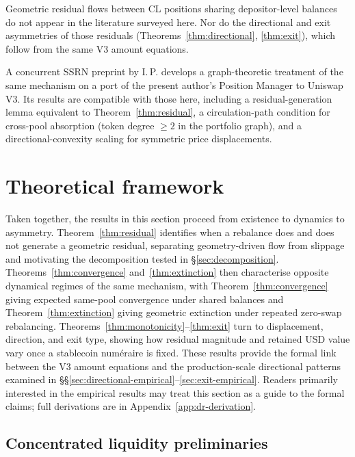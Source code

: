 \documentclass{manuscript}
\begin{document}
Geometric residual flows between CL positions sharing depositor-level balances do not appear in the literature surveyed here. Nor do the directional and exit asymmetries of those residuals (Theorems~\ref{thm:directional}, \ref{thm:exit}), which follow from the same V3 amount equations.

A concurrent SSRN preprint by I.\,P.\cite{secondoperator2026} develops a graph-theoretic treatment of the same mechanism on a port of the present author's Position Manager to Uniswap V3. Its results are compatible with those here, including a residual-generation lemma equivalent to Theorem~\ref{thm:residual}, a circulation-path condition for cross-pool absorption (token degree $\geq 2$ in the portfolio graph), and a directional-convexity scaling for symmetric price displacements.

\clearpage
\section{Theoretical framework}\label{sec:theory}

Taken together, the results in this section proceed from existence to dynamics to asymmetry. Theorem~\ref{thm:residual} identifies when a rebalance does and does not generate a geometric residual, separating geometry-driven flow from slippage and motivating the decomposition tested in \S\ref{sec:decomposition}. Theorems~\ref{thm:convergence} and~\ref{thm:extinction} then characterise opposite dynamical regimes of the same mechanism, with Theorem~\ref{thm:convergence} giving expected same-pool convergence under shared balances and Theorem~\ref{thm:extinction} giving geometric extinction under repeated zero-swap rebalancing. Theorems~\ref{thm:monotonicity}--\ref{thm:exit} turn to displacement, direction, and exit type, showing how residual magnitude and retained USD value vary once a stablecoin num\'eraire is fixed. These results provide the formal link between the V3 amount equations and the production-scale directional patterns examined in \S\S\ref{sec:directional-empirical}--\ref{sec:exit-empirical}. Readers primarily interested in the empirical results may treat this section as a guide to the formal claims; full derivations are in Appendix~\ref{app:dr-derivation}.

\subsection{Concentrated liquidity preliminaries}\label{sec:preliminaries}
\end{document}
